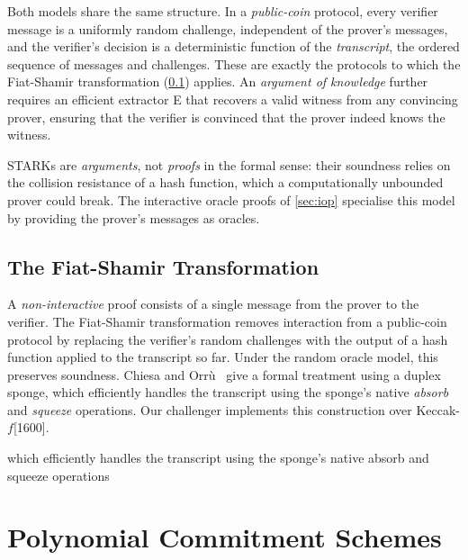 Both models share the same structure. In a \emph{public-coin} protocol,
every verifier message is a uniformly random challenge, independent of
the prover's messages, and the verifier's decision is a deterministic
function of the \emph{transcript}, the ordered sequence of messages
and challenges. These are exactly the protocols to which the
Fiat-Shamir transformation (\cref{subsec:fiat_shamir}) applies. An
\emph{argument of knowledge} further requires an efficient extractor 
E that recovers a valid witness from any convincing prover, ensuring
that the verifier is convinced that the prover indeed knows the witness.

STARKs are \emph{arguments}, not \emph{proofs} in the formal sense:
their soundness relies on the collision resistance of a hash function,
which a computationally unbounded prover could break. The interactive
oracle proofs of \cref{sec:iop} specialise this model by providing the
prover's messages as oracles.

\subsection{The Fiat-Shamir Transformation}
\label{subsec:fiat_shamir}

A \emph{non-interactive} proof consists of a single message from the
prover to the verifier. The Fiat-Shamir transformation removes
interaction from a public-coin protocol by replacing the verifier's
random challenges with the output of a hash function applied to the
transcript so far. Under the random oracle model, this preserves
soundness. Chiesa and Orr\`{u}~\cite{CO25} give a formal treatment
using a duplex sponge, which efficiently handles the transcript using the sponge’s native 
\emph{absorb} and \emph{squeeze} operations. Our challenger implements
this construction over Keccak-$f$[1600].

which efficiently handles the transcript using the sponge’s native absorb and squeeze operations


\section{Polynomial Commitment Schemes}
\label{sec:pcs}


